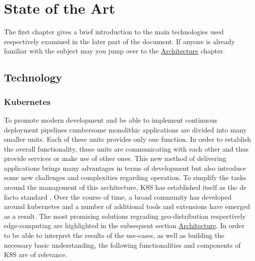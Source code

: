 \documentclass[MSC,Master,english]{twbook}%
\begin{document}
\chapter{State of the Art}
\label{chap:current}
The first chapter gives a brief introduction to the main technologies used respectively examined in the later part of the document. If anyone is already familiar with the subject may you jump over to the \hyperref[sec:architecture]{Architecture} chapter.
\section{Technology}
\label{sec:technology}
\subsection{Kubernetes}
To promote modern development and be able to implement continuous deployment pipelines cumbersome monolithic applications are divided into many smaller units. Each of these units provides only one function. In order to establish the overall functionality, these units are communicating with each other and thus provide services or make use of other ones. This new method of delivering applications brings many advantages in terms of development but also introduce some new challenges and complexities regarding operation. To simplify the tasks around the management of this architecture, \ac{K8S} has established itself as the de facto standard \cite{k8ssurv}. Over the course of time, a broad community has developed around kubernetes and a number of additional tools and extensions have emerged as a result. The most promising solutions regrading geo-distribution respectively edge-computing are highlighted in the subsequent section \hyperref[sec:architecture]{Architecture}. In order to be able to interpret the results of the use-cases, as well as building the necessary basic understanding, the following functionalities and components of \ac{K8S} are of relevance.
\end{document}
